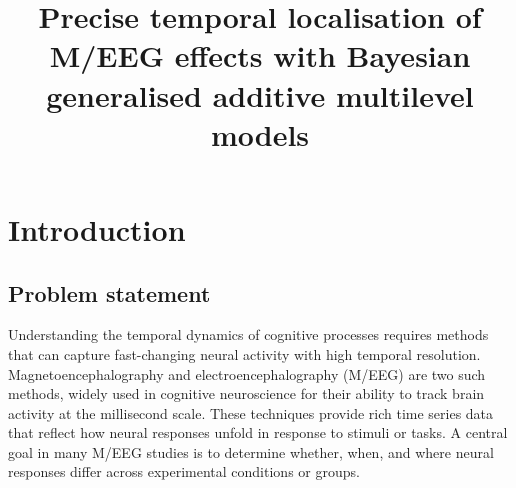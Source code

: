 \documentclass[
  doc,
  floatsintext,
  longtable,
  a4paper,
  nolmodern,
  notxfonts,
  notimes,
  colorlinks=true,linkcolor=blue,citecolor=blue,urlcolor=blue]{apa7}
\title{Precise temporal localisation of M/EEG effects with Bayesian
generalised additive multilevel models}
\begin{document}
\maketitle



\setcounter{secnumdepth}{3}

\setlength\LTleft{0pt}

\resetlinenumber[1]



\setlength{\parindent}{0pt}
\setlength{\parskip}{6pt}

\section{Introduction}\label{introduction}

\subsection{Problem statement}\label{problem-statement}

Understanding the temporal dynamics of cognitive processes requires
methods that can capture fast-changing neural activity with high
temporal resolution. Magnetoencephalography and electroencephalography
(M/EEG) are two such methods, widely used in cognitive neuroscience for
their ability to track brain activity at the millisecond scale. These
techniques provide rich time series data that reflect how neural
responses unfold in response to stimuli or tasks. A central goal in many
M/EEG studies is to determine whether, when, and where neural responses
differ across experimental conditions or groups.
\end{document}
